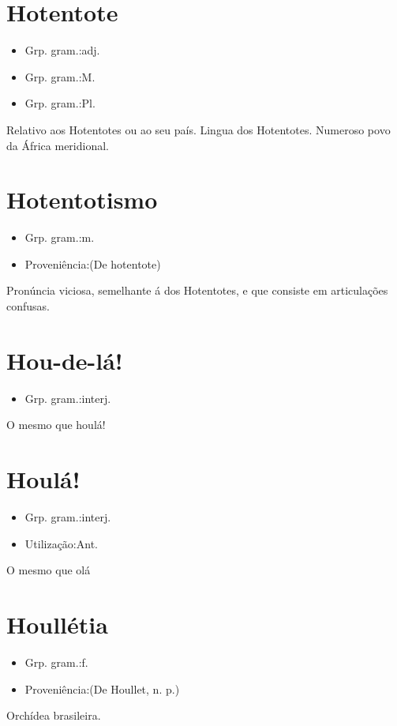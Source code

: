 \documentclass{article}
\begin{document}
\section{Hotentote}
\begin{itemize}
\item {Grp. gram.:adj.}
\end{itemize}
\begin{itemize}
\item {Grp. gram.:M.}
\end{itemize}
\begin{itemize}
\item {Grp. gram.:Pl.}
\end{itemize}
Relativo aos Hotentotes ou ao seu país.
Lingua dos Hotentotes.
Numeroso povo da África meridional.
\section{Hotentotismo}
\begin{itemize}
\item {Grp. gram.:m.}
\end{itemize}
\begin{itemize}
\item {Proveniência:(De \textunderscore hotentote\textunderscore )}
\end{itemize}
Pronúncia viciosa, semelhante á dos Hotentotes, e que consiste em articulações confusas.
\section{Hou-de-lá!}
\begin{itemize}
\item {Grp. gram.:interj.}
\end{itemize}
O mesmo que \textunderscore houlá!\textunderscore 
\section{Houlá!}
\begin{itemize}
\item {Grp. gram.:interj.}
\end{itemize}
\begin{itemize}
\item {Utilização:Ant.}
\end{itemize}
O mesmo que \textunderscore olá\textunderscore 
\section{Houllétia}
\begin{itemize}
\item {Grp. gram.:f.}
\end{itemize}
\begin{itemize}
\item {Proveniência:(De \textunderscore Houllet\textunderscore , n. p.)}
\end{itemize}
Orchídea brasileira.
\end{document}
